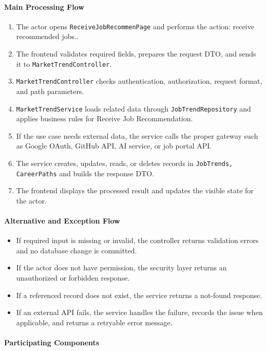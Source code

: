\paragraph{Main Processing Flow}

\begin{enumerate}
    \item The actor opens \texttt{ReceiveJobRecommenPage} and performs the action: receive recommended jobs..
    \item The frontend validates required fields, prepares the request DTO, and sends it to \texttt{MarketTrendController}.
    \item \texttt{MarketTrendController} checks authentication, authorization, request format, and path parameters.
    \item \texttt{MarketTrendService} loads related data through \texttt{JobTrendRepository} and applies business rules for Receive Job Recommendation.
    \item If the use case needs external data, the service calls the proper gateway such as Google OAuth, GitHub API, AI service, or job portal API.
    \item The service creates, updates, reads, or deletes records in \texttt{JobTrends, CareerPaths} and builds the response DTO.
    \item The frontend displays the processed result and updates the visible state for the actor.
\end{enumerate}

\paragraph{Alternative and Exception Flow}

\begin{itemize}
    \item If required input is missing or invalid, the controller returns validation errors and no database change is committed.
    \item If the actor does not have permission, the security layer returns an unauthorized or forbidden response.
    \item If a referenced record does not exist, the service returns a not-found response.
    \item If an external API fails, the service handles the failure, records the issue when applicable, and returns a retryable error message.
\end{itemize}

\paragraph{Participating Components}

